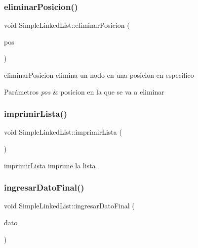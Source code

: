 \subsubsection{\texorpdfstring{eliminar\+Posicion()}{eliminarPosicion()}}
{\footnotesize\ttfamily void Simple\+Linked\+List\+::eliminar\+Posicion (\begin{DoxyParamCaption}\item[{int}]{pos }\end{DoxyParamCaption})\hspace{0.3cm}{\ttfamily [inline]}}



eliminar\+Posicion elimina un nodo en una posicion en especifico 


\begin{DoxyParams}{Parámetros}
{\em pos} & posicion en la que se va a eliminar \\
\hline
\end{DoxyParams}
\mbox{\label{class_simple_linked_list_a4ad22b92d55951e72e45dcf7f2867a5d}} 
\subsubsection{\texorpdfstring{imprimir\+Lista()}{imprimirLista()}}
{\footnotesize\ttfamily void Simple\+Linked\+List\+::imprimir\+Lista (\begin{DoxyParamCaption}{ }\end{DoxyParamCaption})\hspace{0.3cm}{\ttfamily [inline]}}



imprimir\+Lista imprime la lista 

\mbox{\label{class_simple_linked_list_a2da267887f7b64579e3eb56c1940b20a}} 
\subsubsection{\texorpdfstring{ingresar\+Dato\+Final()}{ingresarDatoFinal()}}
{\footnotesize\ttfamily void Simple\+Linked\+List\+::ingresar\+Dato\+Final (\begin{DoxyParamCaption}\item[{Q\+String}]{dato }\end{DoxyParamCaption})\hspace{0.3cm}{\ttfamily [inline]}}




